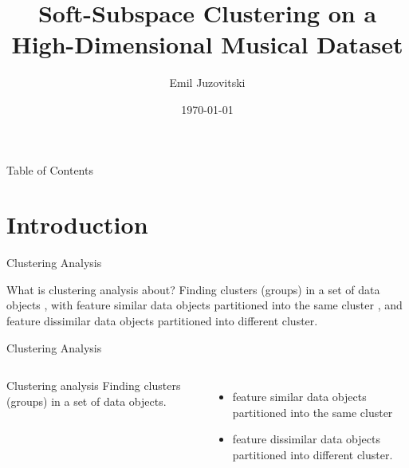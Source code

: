 \documentclass{beamer}
\title{Soft-Subspace Clustering on a High-Dimensional Musical Dataset}
\date{\today}
\author{Emil Juzovitski}
\institute{Master Thesis Presentation}
\begin{document}
\maketitle


\begin{frame}{Table of Contents}
  \tableofcontents
\end{frame}


\section{Introduction}


\begin{frame}{Clustering Analysis}
\begin{block}{What is clustering analysis about?}
Finding \alert{clusters} (groups) in a set of data objects \pause , with \alert{feature similar} data objects partitioned into the same cluster \pause , and \alert{feature dissimilar} data objects partitioned into different cluster.
\end{block}
\end{frame}


\begin{frame}{Clustering Analysis}
\begin{columns}
    \begin{block}{Clustering analysis}
    Finding \alert{clusters} (groups) in a set of data objects.
    \end{block}
    \begin{itemize}
      \item<2> \alert{feature similar} data objects partitioned into the same cluster
      \item<2> \alert{feature dissimilar} data objects partitioned into different cluster.
    \end{itemize}
\end{columns}
\end{frame}

\end{document}
